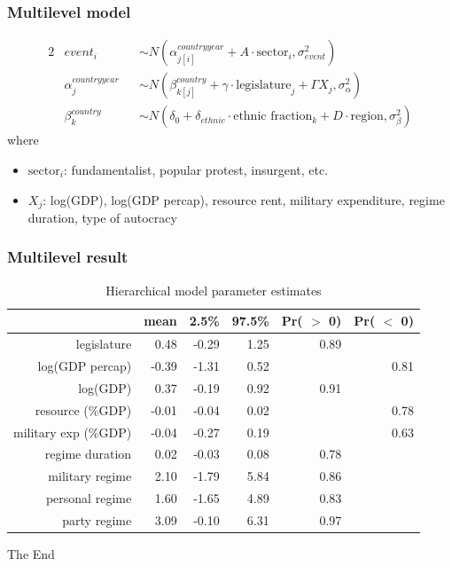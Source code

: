 \documentclass{beamer}
\begin{document}
\begin{frame}
\frametitle{Multilevel model}
\begin{alignat*}{2}
&{event}_i &&\sim N(\alpha^{countryyear}_{j[i]} + A \cdot \text{sector}_i, \sigma^2_{event}) \\
&\alpha_j^{countryyear} &&\sim N(\beta_{k[j]}^{country} + \gamma \cdot \text{legislature}_j + \Gamma X_j, \sigma_{\alpha}^2) \\
&\beta_k^{country} &&\sim N(\delta_0 + \delta_{ethnic} \cdot \text{ethnic fraction}_k + D \cdot \text{region}, \sigma_\beta^2) 
\end{alignat*}
where
\begin{itemize}
\item $\text{sector}_i$: fundamentalist, popular protest, insurgent, etc.
\item $X_j$: log(GDP), log(GDP percap), resource rent, military expenditure, regime duration, type of autocracy
\end{itemize}
\end{frame}

\begin{frame}
\frametitle{Multilevel result}
\begin{table}[H]
\centering
\begin{tabular}{rrrrrr}
  \hline
 & mean & 2.5\% & 97.5\% & Pr( $>$ 0) & Pr( $<$ 0) \\ 
  \hline
legislature & 0.48 & -0.29 & 1.25 & 0.89 &  \\ 
  log(GDP percap) & -0.39 & -1.31 & 0.52 &  & 0.81 \\ 
  log(GDP) & 0.37 & -0.19 & 0.92 & 0.91 &  \\ 
  resource (\%GDP) & -0.01 & -0.04 & 0.02 &  & 0.78 \\ 
  military exp (\%GDP) & -0.04 & -0.27 & 0.19 &  & 0.63 \\ 
  regime duration & 0.02 & -0.03 & 0.08 & 0.78 &  \\ 
  military regime & 2.10 & -1.79 & 5.84 & 0.86 &  \\ 
  personal regime & 1.60 & -1.65 & 4.89 & 0.83 &  \\ 
  party regime & 3.09 & -0.10 & 6.31 & 0.97 &  \\ 
   \hline
\end{tabular}
\caption{Hierarchical model parameter estimates}
\label{tab:hierarchical_estimate}
\end{table}
\end{frame}


\begin{frame}
\Huge{\centerline{The End}}
\end{frame}
\end{document}
